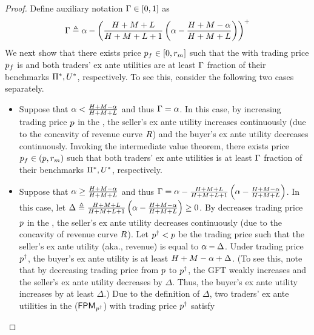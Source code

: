 \begin{proof}
     Define auxiliary notation $\Gamma\in[0, 1]$ as 
    \begin{align*}
        \Gamma \triangleq \displaystyle
        \alpha - \left( \frac{H + M + L}{H + M + L + 1}\left(\alpha - \frac{H + M - \alpha}{H + M + L}\right) \right)^+
    \end{align*}
    We next show that there exists price $p_f\in[0,r_m]$ such that the {\FixPrice} with trading price $p_f$ is {\ksfair} and both traders' ex ante utilities are at least $\Gamma$ fraction of their benchmarks $\Pi^*,U^*$, respectively. To see this, consider the following two cases separately.
    \begin{itemize}
        \item Suppose that $\alpha < \frac{H + M - \alpha}{H + M + L}$ and thus $\Gamma = \alpha$. In this case, by increasing trading price $p$ in the {\FixPrice}, the seller's ex ante utility increases continuously (due to the concavity of revenue curve $R$) and the buyer's ex ante utility decreases continuously. Invoking the intermediate value theorem, there exists price $p_f \in (p, r_m)$ such that both traders' ex ante utilities is at least $\Gamma$ fraction of their benchmarks $\Pi^*,U^*$, respectively.
        \item Suppose that $\alpha \geq \frac{H + M - \alpha}{H + M + L}$ and thus $\Gamma = \alpha - {\frac{H + M + L}{H + M + L + 1}\left(\alpha - \frac{H + M - \alpha}{H + M + L}\right)}$. In this case, let $\Delta \triangleq {\frac{H + M + L}{H + M + L + 1}\left(\alpha- \frac{H + M - \alpha}{H + M + L}\right)}\geq 0$. By decreases trading price $p$ in the {\FixPrice}, the seller's ex ante utility decreases continuously (due to the concavity of revenue curve $R$). Let $p^\dagger < p$ be the trading price such that the seller's ex ante   utility (aka., revenue) is equal to $\alpha - \Delta$. Under trading price $p^\dagger$, the buyer's ex ante utility is at least $H + M - \alpha + \Delta$. (To see this, note that by decreasing trading price from $p$ to $p^\dagger$, the GFT weakly increases and the seller's ex ante utility decreases by $\Delta$. Thus, the buyer's ex ante utility increases by at least $\Delta$.) Due to the definition of $\Delta$, two traders' ex ante utilities in the {\FixPrice} (${\sf FPM}_{p^\dagger}$) with trading price $p^\dagger$ satisfy

\end{itemize}
\end{proof}
